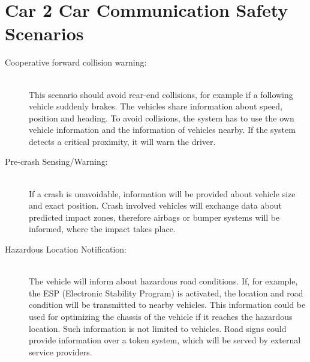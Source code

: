 \section{Car 2 Car Communication Safety Scenarios}
\label{sec:C2CSafetyScenarios}
\begin{description}
  \item[Cooperative forward collision warning:] \hfill \\ This scenario should avoid rear-end collisions, for example if a following vehicle suddenly brakes. The vehicles share information about speed, position and heading. To avoid collisions, the system has to use the own vehicle information and the information of vehicles nearby. If the system detects a critical proximity, it will warn the driver.
  \item[Pre-crash Sensing/Warning:] \hfill \\ If a crash is unavoidable, information will be provided about vehicle size and exact position. Crash involved vehicles will exchange data about predicted impact zones, therefore airbags or bumper systems will be informed, where the impact takes place. 
  \item[Hazardous Location Notification:] \hfill \\ The vehicle will inform about hazardous road conditions. If, for example, the ESP (Electronic Stability Program) is activated, the location and road condition will be transmitted to nearby vehicles. This information could be used for optimizing the chassis of the vehicle if it reaches the hazardous location. Such information is not limited to vehicles. Road signs could provide information over a token system, which will be served by external service providers. 
\end{description}	

